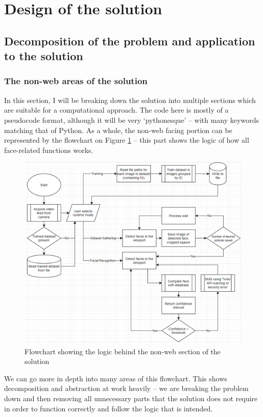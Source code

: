 \documentclass[9pt]{article}
\begin{document}
\section{Design of the solution}\label{sec_design}
\subsection{Decomposition of the problem and application to the solution}\label{sec_decomposition}
\subsubsection{The non-web areas of the solution}\label{sec_nonWeb}
In this section, I will be breaking down the solution into multiple sections which are suitable for a computational approach. The code here is mostly of a pseudocode format, although it will be very `pythonesque’ – with many keywords matching that of Python.
As a whole, the non-web facing portion can be represented by the flowchart on Figure \ref{fig_flowOverview} – this part shows the logic of how all face-related functions works.
\begin{figure}[H]
	\centering
	\includegraphics{flowOverview.png}
	\caption{Flowchart showing the logic behind the non-web section of the solution}\label{fig_flowOverview}
\end{figure}
We can go more in depth into many areas of this flowchart. This shows decomposition and abstraction at work heavily – we are breaking the problem down and then removing all unnecessary parts that the solution does not require in order to function correctly and follow the logic that is intended. 
\end{document}
